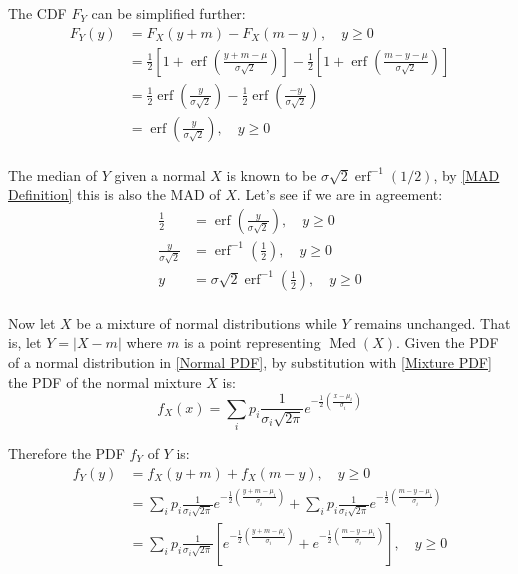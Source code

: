 \documentclass{article}
\DeclareMathOperator\erf{erf}
\DeclareMathOperator\Med{Med}
\begin{document}
The CDF $F_Y$ can be simplified further:
%
\begin{equation}\label{CDF of Half-Normal}
\begin{split}
F_Y(y) &= F_X(y+m) - F_X(m-y)
    , \quad y \geq 0 \\
&=  \frac{1}{2} \left[ 1 + \erf
    \left( \frac{y + m - \mu}{\sigma\sqrt{2}} \right) \right]
-   \frac{1}{2}  \left[ 1 + \erf
    \left( \frac{m - y - \mu}{\sigma\sqrt{2}} \right) \right] \\
&=  \frac{1}{2} \erf \left( \frac{y}{\sigma\sqrt{2}} \right)
-   \frac{1}{2} \erf \left( \frac{-y}{\sigma\sqrt{2}} \right) \\
&=  \erf \left( \frac{y}{\sigma\sqrt{2}} \right)
,   \quad y \geq 0 \\
\end{split}
\end{equation}

The median of $Y$ given a normal $X$ is known to be $\sigma\sqrt{2}\erf^{-1}(1/2)$, by \ref{MAD Definition} this is also the MAD of $X$. Let's see if we are in agreement:
%
\begin{equation}\label{Median of Half-Normal}
\begin{split}
\frac{1}{2}
&= \erf \left( \frac{y}{\sigma\sqrt{2}} \right)
,   \quad y \geq 0 \\
    \frac{y}{\sigma\sqrt{2}}
&=  \erf^{-1} \left( \frac{1}{2} \right)
,   \quad y \geq 0 \\
    y
&=  \sigma \sqrt{2} \erf^{-1} \left( \frac{1}{2} \right)
,   \quad y \geq 0 \\
\end{split}
\end{equation}

Now let $X$ be a mixture of normal distributions while $Y$ remains unchanged. That is, let $Y = \lvert X - m \rvert$ where $m$ is a point representing $\Med(X)$. Given the PDF of a normal distribution in \ref{Normal PDF}, by substitution with \ref{Mixture PDF} the PDF of the normal mixture $X$ is:
%
\begin{equation}\label{Normal Mixture PDF}
f_X(x) = \sum_i p_i \frac{1}{\sigma_i\sqrt{2\pi}}
    e^{-\frac{1}{2} \left( \frac{x - \mu_i}{\sigma_i} \right)}
\end{equation}

Therefore the PDF $f_Y$ of $Y$ is:
%
\begin{equation}\label{AD PDF of Normal Mixture}
\begin{split}
f_Y(y) &= f_X(y+m) + f_X(m-y)
    , \quad y \geq 0 \\
&=  \sum_i p_i \frac{1}{\sigma_i\sqrt{2\pi}}
    e^{-\frac{1}{2} \left( \frac{y + m - \mu_i}{\sigma_i} \right)}
+   \sum_i p_i \frac{1}{\sigma_i\sqrt{2\pi}}
    e^{-\frac{1}{2} \left( \frac{m - y - \mu_i}{\sigma_i} \right)} \\
&=  \sum_i p_i \frac{1}{\sigma_i\sqrt{2\pi}} \left[
    e^{-\frac{1}{2} \left( \frac{y + m - \mu_i}{\sigma_i} \right)}
+   e^{-\frac{1}{2} \left( \frac{m - y - \mu_i}{\sigma_i} \right)}
    \right]
,   \quad y \geq 0 \\
\end{split}
\end{equation}
\end{document}

